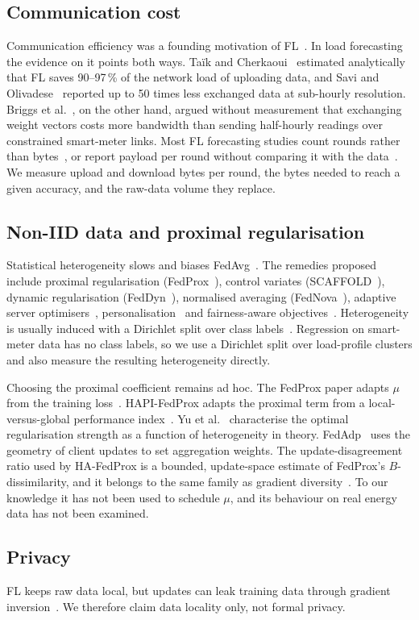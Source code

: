 \subsection{Communication cost}
Communication efficiency was a founding motivation of FL~\cite{mcmahan2017fedavg,konecny2016comm}.
In load forecasting the evidence on it points both ways. Taïk and Cherkaoui~\cite{taik2020} estimated analytically
that FL saves 90--97\,\% of the network load of uploading data, and Savi and Olivadese~\cite{savi2021} reported up to
50 times less exchanged data at sub-hourly resolution. Briggs et al.~\cite{briggs2020ccai}, on the other hand,
argued without measurement that exchanging weight vectors costs more bandwidth than sending half-hourly readings over
constrained smart-meter links.
Most FL forecasting studies count rounds rather than bytes~\cite{fekri2022}, or report payload per round without
comparing it with the data~\cite{bose2023pl}. We measure upload and download bytes per round, the bytes needed to
reach a given accuracy, and the raw-data volume they replace.

\subsection{Non-IID data and proximal regularisation}
Statistical heterogeneity slows and biases FedAvg~\cite{zhao2018noniid,hsieh2020quagmire,kairouz2021advances}.
The remedies proposed include proximal regularisation (FedProx~\cite{li2020fedprox}), control variates
(SCAFFOLD~\cite{karimireddy2020scaffold}), dynamic regularisation (FedDyn~\cite{acar2021feddyn}), normalised
averaging (FedNova~\cite{wang2020fednova}), adaptive server optimisers~\cite{reddi2021fedopt},
personalisation~\cite{fallah2020perfedavg,li2021ditto} and fairness-aware objectives~\cite{li2020qffl}.
Heterogeneity is usually induced with a Dirichlet split over class labels~\cite{hsu2019dirichlet}. Regression on
smart-meter data has no class labels, so we use a Dirichlet split over load-profile clusters and also measure the
resulting heterogeneity directly.

Choosing the proximal coefficient remains ad hoc. The FedProx paper adapts $\mu$ from the training
loss~\cite{li2020fedprox}. HAPI-FedProx adapts the proximal term from a local-versus-global performance
index~\cite{mhou2025hapi}. Yu et al.~\cite{yu2025pflminimax} characterise the optimal regularisation strength as a
function of heterogeneity in theory. FedAdp~\cite{wu2021fedadp} uses the geometry of client updates to set
aggregation weights. The update-disagreement ratio used by HA-FedProx is a bounded, update-space estimate of
FedProx's $B$-dissimilarity, and it belongs to the same family as gradient diversity~\cite{yin2018diversity}. To our
knowledge it has not been used to schedule $\mu$, and its behaviour on real energy data has not been examined.

\subsection{Privacy}
FL keeps raw data local, but updates can leak training data through gradient inversion~\cite{zhu2019leakage,
geiping2020inverting}. We therefore claim data locality only, not formal privacy.
